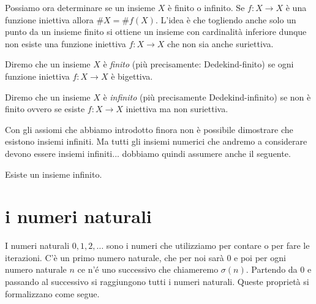 Possiamo ora determinare se un insieme $X$ è finito o infinito.
Se $f\colon X \to X$ è una funzione iniettiva allora 
$\#X = \#f(X)$.
L'idea è che togliendo anche solo un punto da un insieme finito si ottiene 
un insieme con cardinalità inferiore dunque 
non esiste una funzione iniettiva $f\colon X\to X$ che non 
sia anche suriettiva.

\begin{definition}[infinito]
  \label{def:infinito}%
  Diremo che un insieme $X$ è \emph{finito}
  (più precisamente: Dedekind-finito)
  se ogni funzione iniettiva $f\colon X\to X$ è bigettiva.
%

  Diremo che un insieme $X$ è \emph{infinito} 
  (più precisamente Dedekind-infinito)
  se non è finito ovvero
  se esiste $f\colon X\to X$ iniettiva ma non suriettiva.
%
\end{definition}

Con gli assiomi che abbiamo introdotto finora non è possibile dimostrare 
che esistono insiemi infiniti. 
Ma tutti gli insiemi numerici che andremo a considerare devono essere 
insiemi infiniti... dobbiamo quindi assumere anche il seguente. 

\begin{axiom}[infinito]
  \label{axiom:infinito}%
  Esiste un insieme infinito. 
\end{axiom}

\section{i numeri naturali}

I numeri naturali $0,1,2,\dots$ sono i numeri che utilizziamo per contare o per 
fare le iterazioni. C'è un primo numero naturale, che per noi sarà $0$ e poi
per ogni numero naturale $n$ ce n'é uno successivo che chiameremo $\sigma(n)$. 
Partendo da $0$ e passando al successivo si raggiungono tutti i numeri naturali.
Queste proprietà si formalizzano come segue. 

